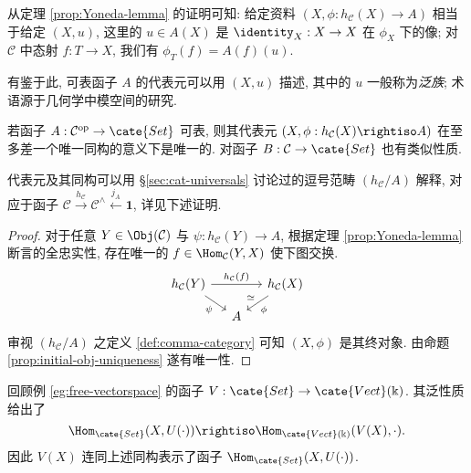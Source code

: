 \begin{remark}\label{rem:Yoneda-universal-family}
	从定理 \ref{prop:Yoneda-lemma} 的证明可知: 给定资料 $(X, \phi: h_{\mathcal{C}}(X) \to A)$ 相当于给定 $(X, u)$, 这里的 $u \in A(X)$ 是 $\identity_X: X \to X$ 在 $\phi_X$ 下的像; 对 $\mathcal{C}$ 中态射 $f: T \to X$, 我们有 $\phi_T(f) = A(f)(u)$.
	
	有鉴于此, 可表函子 $A$ 的代表元可以用 $(X, u)$ 描述, 其中的 $u$ 一般称为\emph{泛族}; 术语源于几何学中模空间的研究.
\end{remark}

\begin{lemma}\label{prop:representable-functor-uniqueness}
	若函子 $A: \mathcal{C}^\text{op} \to \cate{Set}$ 可表, 则其代表元 $(X, \phi: h_{\mathcal{C}}(X) \rightiso A)$ 在至多差一个唯一同构的意义下是唯一的. 对函子 $B: \mathcal{C} \to \cate{Set}$ 也有类似性质.
\end{lemma}

代表元及其同构可以用  \S\ref{sec:cat-universals} 讨论过的逗号范畴 $(h_{\mathcal{C}} / A)$ 解释, 对应于函子 $\mathcal{C} \xrightarrow{h_{\mathcal{C}}} \mathcal{C}^\wedge \xleftarrow{j_A} \mathbf{1}$, 详见下述证明.
\begin{proof}
	对于任意 $Y \in \Obj(\mathcal{C})$ 与 $\psi: h_{\mathcal{C}}(Y) \to A$, 根据定理 \ref{prop:Yoneda-lemma} 断言的全忠实性, 存在唯一的 $f \in \Hom_{\mathcal{C}}(Y, X)$ 使下图交换.
	\[\begin{tikzcd}[column sep=small, row sep=small]
		h_{\mathcal{C}}(Y) \arrow[rd, "\psi"'] \arrow[rr, "h_{\mathcal{C}}(f)"] & & h_{\mathcal{C}}(X) \arrow[ld, "\phi", "\simeq"'] \\
		 & A &
	\end{tikzcd}\]
	审视 $(h_{\mathcal{C}} / A)$ 之定义 \ref{def:comma-category} 可知 $(X, \phi)$ 是其终对象. 由命题 \ref{prop:initial-obj-uniqueness} 遂有唯一性.
\end{proof}

\begin{example}
	回顾例 \ref{eg:free-vectorspace} 的函子 $V: \cate{Set} \to \cate{Vect}(\Bbbk)$. 其泛性质给出了
	\[ \Hom_{\cate{Set}}(X, U(\cdot)) \rightiso \Hom_{\cate{Vect}(\Bbbk)}(V(X), \cdot). \]
	因此 $V(X)$ 连同上述同构表示了函子 $\Hom_{\cate{Set}}(X, U(\cdot))$.
\end{example}

